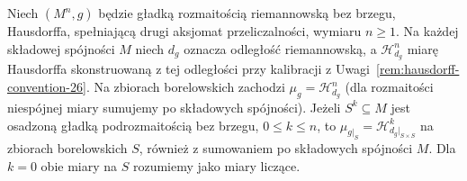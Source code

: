 \begin{wniosek}
\label{cor:riemann-hausdorff-28}
Niech $(M^n,g)$ będzie gładką rozmaitością riemannowską
bez brzegu, Hausdorffa, spełniającą drugi aksjomat
przeliczalności, wymiaru $n\ge1$. Na każdej składowej
spójności $M$ niech $d_g$ oznacza odległość riemannowską,
a $\mathcal H^n_{d_g}$ miarę Hausdorffa skonstruowaną
z tej odległości przy kalibracji z
Uwagi~\ref{rem:hausdorff-convention-26}.
Na zbiorach borelowskich zachodzi
$\mu_g=\mathcal H^n_{d_g}$ (dla rozmaitości niespójnej
miary sumujemy po składowych spójności).
Jeżeli $S^k\subseteq M$ jest osadzoną gładką
podrozmaitością bez brzegu, $0\le k\le n$, to
$\mu_{g|_S}=\mathcal H^k_{d_g|_{S\times S}}$
na zbiorach borelowskich $S$, również z sumowaniem
po składowych spójności $M$. Dla $k=0$ obie
miary na $S$ rozumiemy jako miary liczące.
\end{wniosek}
